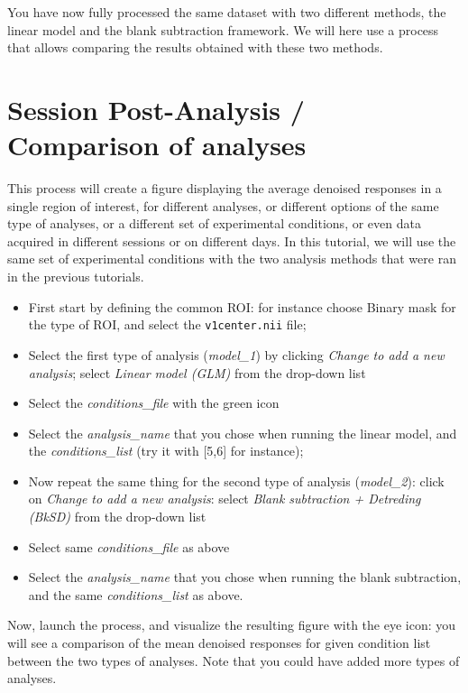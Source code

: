 

You have now fully processed the same dataset with two different methods, the linear model and the blank subtraction framework. We will here use a process that allows comparing the results obtained with these two methods.


\section{Session Post-Analysis / Comparison of analyses}

This process will create a figure displaying the average denoised responses in a single region of interest, for different analyses, or different options of the same type of analyses, or a different set of experimental conditions, or even data acquired in different sessions or on different days. In this tutorial, we will use the same set of experimental conditions with the two analysis methods that were ran in the previous tutorials.


\begin{itemize}
  \item First start by defining the common ROI: for instance choose Binary mask for the type of ROI, and select the \texttt{v1center.nii} file;
  \item Select the first type of analysis (\textit{model\_1}) by clicking \textit{Change to add a new analysis}; select \textit{Linear model (GLM)} from the drop-down list
  \item Select the \textit{conditions\_file} with the green icon
  \item Select the \textit{analysis\_name} that you chose when running the linear model, and the \textit{conditions\_list} (try it with [5,6] for instance);
  \item Now repeat the same thing for the second type of analysis (\textit{model\_2}): click on \textit{Change to add a new analysis}: select \textit{Blank subtraction + Detreding (BkSD)} from the drop-down list
  \item Select same \textit{conditions\_file} as above
  \item Select the \textit{analysis\_name} that you chose when running the blank subtraction, and the same \textit{conditions\_list} as above.
\end{itemize}

Now, launch the process, and visualize the resulting figure with the eye icon: you will see a comparison of the mean denoised responses for given condition list between the two types of analyses. Note that you could have added more types of analyses.
